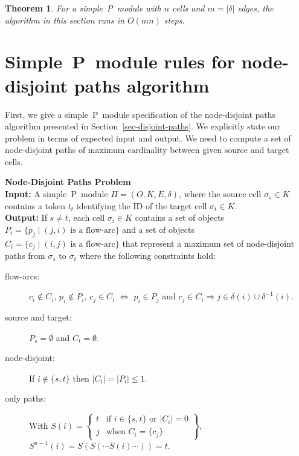 \documentclass[preliminary,copyright,creativecommons]{eptcs}
\newtheorem{theorem}{Theorem}
\theoremstyle{remark}
\begin{document}
\begin{theorem}
For a simple~P~module with $n$ cells and $m = |\delta|$ edges,
the algorithm in this section runs in $O(mn)$ steps.
\end{theorem}


\section{Simple~P~module rules for node-disjoint paths algorithm}
\label{sec-node-disjoint-path-algorithm-rules}

First, we give a simple~P~module specification of the 
node-disjoint paths algorithm presented in Section~\ref{sec-disjoint-paths}.  
We explicitly state our problem in terms of expected input and output.
We need to compute a set of node-disjoint paths of maximum cardinality
between given source and target cells. 

\medskip

\noindent \textbf{Node-Disjoint Paths Problem}\\
\noindent \textbf{Input:} A simple~P~module $\Pi= (O, K, E, \delta)$, 
where the source cell $\sigma_s \in K$ contains a token $t_t$ identifying
the ID of the target cell $\sigma_t \in K$.\\
\noindent \textbf{Output:}  If $s\not=t$, each cell $\sigma_i \in K$
contains a set of objects $P_i = \{ p_j \mid (j,i) \mbox{ is a flow-arc}\}$ and  
a set of objects $C_i = \{ c_j \mid (i,j) \mbox{ is a flow-arc}\}$ that 
represent a maximum set of
node-disjoint paths from $\sigma_s$ to $\sigma_t$ where the following constraints hold:\\

\begin{minipage}{5.5in}
\begin{description}
\item[flow-arcs:] 
     $c_i \not\in C_i$, $p_i \not\in P_i$, 
     $c_j \in C_i$ $\Leftrightarrow$ $p_i \in P_j$ and 
     $c_j \in C_i \Rightarrow j \in \delta(i) \cup \delta^{-1}(i)$.
\item[source and target:] 
     $P_s=\emptyset$ and $C_t=\emptyset$.
\item[node-disjoint:] 
     If $i\not\in \{s,t\}$ then $|C_i|=|P_i| \leq 1$. 
\item[only paths:] 
     With $S(i)=\left\{ 
     \begin{array}{cl}
     t & \mbox{if } i\in \{s,t\} \mbox{ or } |C_i|=0\\
     j & \mbox{when } C_i=\{c_j\}
     \end{array}
     \right\}$, $S^{n-1}(i)=S(S(\cdots S(i)\cdots))=t$.
\end{description}
\end{minipage}
\end{document}
